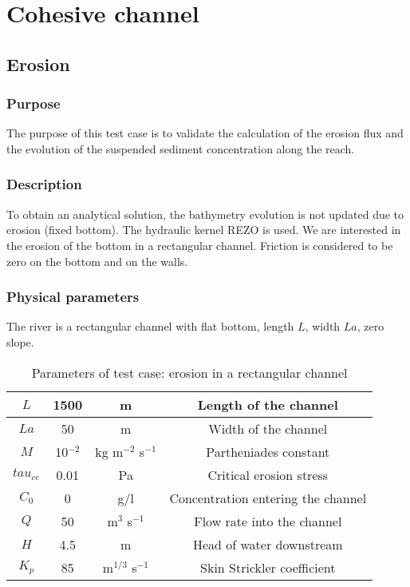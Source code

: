 \chapter{Cohesive channel}\label{chapter:cohesive channel}

\section{Erosion}

\subsection{Purpose}

The purpose of this test case is to validate the calculation of the
erosion flux and the evolution of the suspended sediment concentration
along the reach.

\subsection{Description}

To obtain an analytical solution, the bathymetry evolution
is not updated due to erosion (fixed bottom). The hydraulic kernel
REZO is used. We are interested in the erosion of the
bottom in a rectangular channel. Friction is considered to be zero
on the bottom and on the walls.

\subsection{Physical parameters}

The river is a rectangular channel with flat bottom, length $L$, width
$La$, zero slope.

 \begin{table}[h!]
   \begin{center}
   \caption{Parameters of test case: erosion in a rectangular channel}
       \begin{tabular}{|c|c|c|c|}
       \hline
$L$ & 1500 & m & Length of the channel\\ \hline
$La$ & 50 & m & Width of the channel\\ \hline
$M$ & 10$^{-2}$ & kg m$^{-2}$ s$^{-1}$ & Partheniades constant\\ \hline
$tau_{ce}$ & 0.01 & Pa & Critical erosion stress\\ \hline
$C_0$ & 0 & g/l & Concentration entering the channel\\ \hline
$Q$ & 50 & m$^{3}$ s$^{-1}$ & Flow rate into the channel\\ \hline
$H$ & 4.5 & m & Head of water downstream\\ \hline
$K_p $ & 85 & m$^{1/3}$ s$^{-1}$ & Skin Strickler coefficient\\ \hline
        \end{tabular}
     \end{center}
\end{table}

